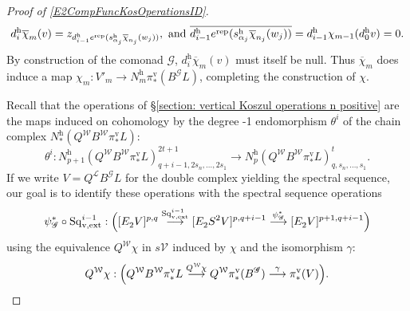 \documentclass[11pt]{amsart} \renewcommand{\baselinestretch}{1.4}
\theoremstyle{plain}
\theoremstyle{definition}
\renewcommand{\to}{\longrightarrow}
\newcommand{\scrG}{\mathscr{G}}
\newcommand{\calL}{\mathcal{L}}
\newcommand{\calV}{\mathcal{V}}
\newcommand{\calw}{\mathcal{W}}
\newcommand{\vect}[2]{\calV^{#1}_{#2}}
\newcommand{\BSW}{{\scrG}}
\newcommand{\BSWres}{B^\BSW}%
\newcommand{\vExtCohOp}{\mathrm{Sq}_\mathrm{v,ext}}
\newcommand{\Edownup}[5]{[E_{#1}^{#2}#3]^{#4}_{#5}}
\newcommand{\uver}{^\mathrm{v}}
\newcommand{\uhor}{^\mathrm{h}}
\begin{document}
\begin{Operations in composite functor spectral sequences}
\begin{proof}[Proof of \ref{E2CompFuncKosOperationsID}]
\[d\uhor_i\overline{\chi}_m(v) =z_{d\uhor_{i-1}e^\textup{rep}(s\uhor_{\alpha_j}\overline{\chi}_{n_j}(w_j))}, \textup{ and }\overline{d\uhor_{i-1}e^\textup{rep}(s\uhor_{\alpha_j}\overline{\chi}_{n_j}(w_j))}=d\uhor_{i-1}\chi_{m-1}(d\uhor_0v)=0.\]
By construction of the comonad $\BSW$, $d\uhor_i\overline{\chi}_m(v)$ must itself be null. 
Thus $\overline{\chi}_m$ does induce a map $\chi_m:V'_m\to N\uhor_m\pi\uver_*(\BSWres L)$, completing the construction of $\chi$.

Recall that the operations of \S\ref{section: vertical Koszul operations n positive} are the maps induced on cohomology by the degree -1 endomorphism $\theta^i$ of the chain complex $N\uhor_*(Q^{\calw} B^{\calw}\pi\uver_*L)$:
\[\theta^i:N\uhor_{p+1}(Q^{\calw} B^{\calw}\pi\uver_*L)^{2t+1}_{q+i-1,2s_n,\ldots,2s_1}\to N\uhor_{p}(Q^{\calw} B^{\calw}\pi\uver_*L)^{t}_{q,s_n,\ldots,s_1}.\]
If we write $V=Q^{\calL}\BSWres L$ for the double complex yielding the spectral sequence, our goal is to identify these operations with the spectral sequence operations
\[\psi_\BSW^*\circ\vExtCohOp^{i-1}:\Bigl(\Edownup{2}{}{V}{p,q}{}\overset{\vExtCohOp^{i-1}}{\to} \Edownup{2}{}{S^2V}{p,q+i-1}{}\overset{\psi_\BSW^*}{\to}\Edownup{2}{}{V}{p+1,q+i-1}{}\Bigr)\]
using the equivalence $Q^{\calw}\chi$ in $s\vect{}{}$ induced by $\chi$ and the isomorphism $\gamma$:%
\[Q^{\calw}\chi:\Bigl(Q^{\calw}B^{\calw} \pi\uver_*L\overset{Q^{\calw}\chi}{\to} Q^{\calw}\pi\uver_*(\BSWres )\overset{\gamma}{\to}\pi\uver_*(V)\Bigr).\]


\end{proof}
\end{Operations in composite functor spectral sequences}
\end{document}
